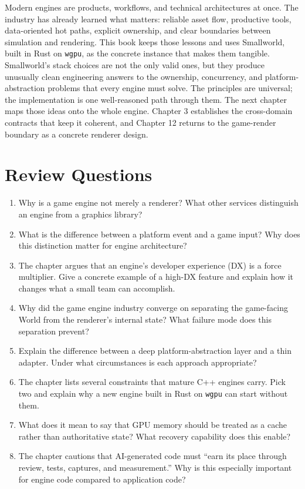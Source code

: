 \documentclass[
  11pt,
  letterpaper,
  DIV=11,
  numbers=noendperiod,
  twoside,
  open=right]{scrreprt}
\begin{document}
Modern engines are products, workflows, and technical architectures at
once. The industry has already learned what matters: reliable asset
flow, productive tools, data-oriented hot paths, explicit ownership, and
clear boundaries between simulation and rendering. This book keeps those
lessons and uses Smallworld, built in Rust on \texttt{wgpu}, as the
concrete instance that makes them tangible. Smallworld's stack choices
are not the only valid ones, but they produce unusually clean
engineering answers to the ownership, concurrency, and
platform-abstraction problems that every engine must solve. The
principles are universal; the implementation is one well-reasoned path
through them. The next chapter maps those ideas onto the whole engine.
Chapter 3 establishes the cross-domain contracts that keep it coherent,
and Chapter 12 returns to the game-render boundary as a concrete
renderer design.

\section*{Review Questions}\label{review-questions}


\begin{enumerate}
\def\labelenumi{\arabic{enumi}.}
\item
  Why is a game engine not merely a renderer? What other services
  distinguish an engine from a graphics library?
\item
  What is the difference between a platform event and a game input? Why
  does this distinction matter for engine architecture?
\item
  The chapter argues that an engine's developer experience (DX) is a
  force multiplier. Give a concrete example of a high-DX feature and
  explain how it changes what a small team can accomplish.
\item
  Why did the game engine industry converge on separating the
  game-facing World from the renderer's internal state? What failure
  mode does this separation prevent?
\item
  Explain the difference between a deep platform-abstraction layer and a
  thin adapter. Under what circumstances is each approach appropriate?
\item
  The chapter lists several constraints that mature C++ engines carry.
  Pick two and explain why a new engine built in Rust on \texttt{wgpu}
  can start without them.
\item
  What does it mean to say that GPU memory should be treated as a cache
  rather than authoritative state? What recovery capability does this
  enable?
\item
  The chapter cautions that AI-generated code must ``earn its place
  through review, tests, captures, and measurement.'' Why is this
  especially important for engine code compared to application code?
\end{enumerate}
\end{document}
